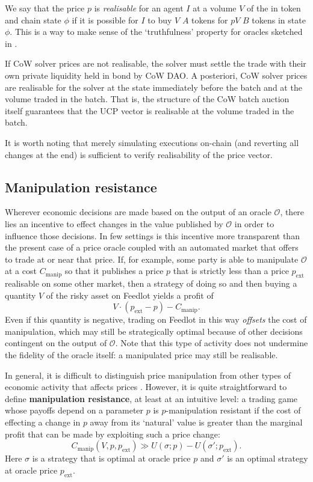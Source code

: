 \documentclass[a4paper,10pt]{article}
\theoremstyle{remark}
\newcommand \oracle {\mathcal{O}}
\begin{document}
We say that the price $p$ is \emph{realisable} for an agent $I$ at a volume $V$ of the in token and chain state $\phi$ if it is possible for $I$ to buy $V$ $A$ tokens for $pV$ $B$ tokens in state $\phi$.
%
This is a way to make sense of the `truthfulness' property for oracles sketched in \cite{heiss2019oracles}.

If CoW solver prices are not realisable, the solver must settle the trade with their own private liquidity held in bond by CoW DAO.
%
A posteriori, CoW solver prices are realisable for the solver at the state immediately before the batch and at the volume traded in the batch.
%
That is, the structure of the CoW batch auction itself guarantees that the UCP vector is realisable at the volume traded in the batch.

It is worth noting that merely simulating executions on-chain (and reverting all changes at the end) is sufficient to verify realisability of the price vector.

\subsection{Manipulation resistance}
\label{manipulation}

Wherever economic decisions are made based on the output of an oracle $\mathcal{O}$, there lies an incentive to effect changes in the value published by $\mathcal{O}$ in order to influence those decisions. 
%
In few settings is this incentive more transparent than the present case of a price oracle coupled with an automated market that offers to trade at or near that price.
%
If, for example, some party is able to manipulate $\mathcal{O}$ at a cost $C_\mathrm{manip}$ so that it publishes a price $p$ that is strictly less than a price $p_\mathrm{ext}$ realisable on some other market, then a strategy of doing so and then buying a quantity $V$ of the risky asset on Feedlot yields a profit of
\[
  V\cdot (p_\mathrm{ext}-p) - C_\mathrm{manip}.
\]
Even if this quantity is negative, trading on Feedlot in this way \emph{offsets} the cost of manipulation, which may still be strategically optimal because of other decisions contingent on the output of $\oracle$.
%
Note that this type of activity does not undermine the fidelity of the oracle itself: a manipulated price may still be realisable.

In general, it is difficult to distinguish price manipulation from other types of economic activity that affects prices \cite{kyle2008define, zhang2022competition}.
%
However, it is quite straightforward to define \textbf{manipulation resistance}, at least at an intuitive level: a trading game whose payoffs depend on a parameter $p$ is $p$-manipulation resistant if the cost of effecting a change in $p$ away from its `natural' value is greater than the marginal profit that can be made by exploiting such a price change:
%
\[
  C_\mathrm{manip}(V,p,p_\mathrm{ext}) \gg U(\sigma;p) - U(\sigma';p_\mathrm{ext}).
\]
Here $\sigma$ is a strategy that is optimal at oracle price $p$ and $\sigma'$ is an optimal strategy at oracle price $p_\mathrm{ext}$.
\end{document}
